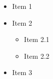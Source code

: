 \begin{itemize}
    \item Item 1
    \item Item 2
    \begin{itemize}
        \item Item 2.1
        \item Item 2.2
    \end{itemize}
    \item Item 3
\end{itemize}